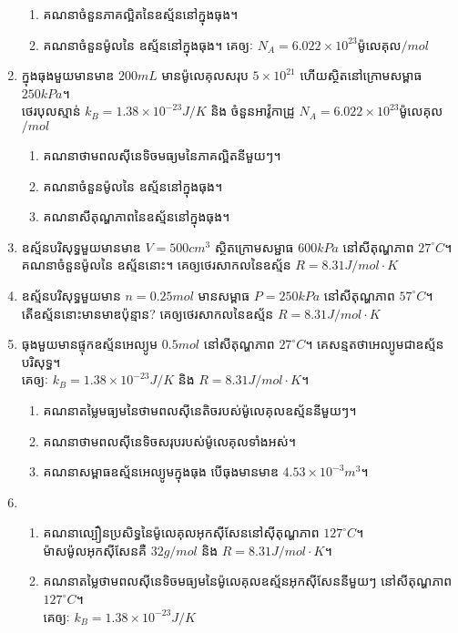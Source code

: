 \begin{enumerate}[m]
	\begin{enumerate}[k]
		\item គណនាចំនួនភាគល្អិតនៃឧស្ម័ននៅក្នុងធុង។
		\item គណនាចំនួនម៉ូលនៃ ឧស្ម័ននៅក្នុងធុង។ គេឲ្យៈ $N_{A}=6.022\times10^{23}$ម៉ូលេគុល$/mol$
	\end{enumerate}
\item ក្នុងធុងមួយមានមាឌ $200mL$ មានម៉ូលេគុលសរុប $5\times10^{21}$ ហើយស្ថិតនៅក្រោមសម្ពាធ $250kPa$។\\ ថេរបុលស្មាន់ $k_{B}=1.38\times10^{-23}J/K$ និង ចំនួនអាវ៉ូកាដ្រូ $N_{A}=6.022\times10^{23}$ម៉ូលេគុល$/mol$
\begin{enumerate}[k]
	\item គណនាថាមពលសុីនេទិចមធ្យមនៃភាគល្អិតនីមួយៗ។
	\item គណនាចំនួនម៉ូលនៃ ឧស្ម័ននៅក្នុងធុង។
	\item គណនាសីតុណ្ហភាពនៃឧស្ម័ននៅក្នុងធុង។
\end{enumerate}
\item ឧស្ម័នបរិសុទ្ធមួយមានមាឌ $V=500cm^{3}$ ស្ថិតក្រោមសម្ជាធ $600kPa$ នៅសីតុណ្ហភាព $27^\circ C$។ \\គណនាចំនួនម៉ូលនៃ ឧស្ម័ននោះ។ គេឲ្យថេរសាកលនៃឧស្ម័ន $R=8.31J/mol\cdot K$
\item ឧស្ម័នបរិសុទ្ធមួយមាន $n=0.25mol$ មានសម្ពាធ $P=250kPa$ នៅសីតុណ្ហភាព $57^\circ C$។ \\តើឧស្ម័ននោះមានមាឌប៉ុន្មាន? គេឲ្យថេរសាកលនៃឧស្ម័ន $R=8.31J/mol\cdot K$
\item ធុងមួយមានផ្ទុកឧស្ម័នអេល្យូម $0.5mol$ នៅសីតុណ្ហភាព $27^\circ C$។ គេសន្មតថាអេល្យូមជាឧស្ម័នបរិសុទ្ធ។\\ គេឲ្យៈ $k_{B}=1.38\times10^{-23}J/K$ និង $R=8.31J/mol\cdot K$។
\begin{enumerate}[k]
	\item គណនាតម្លៃមធ្យមនៃថាមពលសុីនេតិចរបស់ម៉ូលេគុលឧស្ម័ននីមួយៗ។
	\item គណនាថាមពលសុីនេទិចសរុបរបស់ម៉ូលេគុលទាំងអស់។
	\item គណនាសម្ពាធឧស្ម័នអេល្យូមក្នុងធុង​ បើធុងមានមាឌ $4.53\times10^{-3}m^{3}$។
\end{enumerate}
\item \begin{enumerate}[k]
	\item គណនាល្បឿនប្រសិទ្ធនៃម៉ូលេគុលអុកសុីសែននៅសុីតុណ្ហភាព $127^\circ C$។ \\ម៉ាសម៉ូលអុកសុីសែនគឺ $32g/mol$ និង $R=8.31J/mol\cdot K$។
	\item គណនាតម្លៃថាមពលសុីនេទិចមធ្យមនៃម៉ូលេគុលឧស្ម័នអុកសុីសែននីមួយៗ នៅសីតុណ្ហភាព $127^\circ C$។ \\គេឲ្យៈ $k_{B}=1.38\times10^{-23}J/K$

\end{enumerate}
\end{enumerate}
